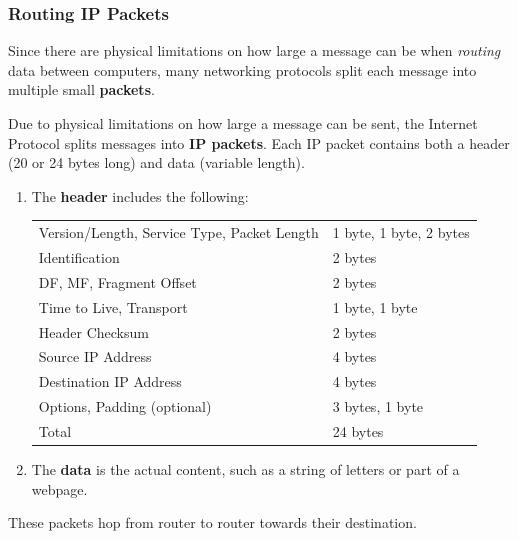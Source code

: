 \documentclass{article}
\begin{document}
  \subsubsection{Routing IP Packets}
  Since there are physical limitations on how large a message can be when \textit{routing} data between computers, many networking protocols split each message into multiple small \textbf{packets}. 

  \begin{definition}
  Due to physical limitations on how large a message can be sent, the Internet Protocol splits messages into \textbf{IP packets}. Each IP packet contains both a header (20 or 24 bytes long) and data (variable length). 
  \begin{enumerate}
      \item The \textbf{header} includes the following: 
      \begin{center}
      \begin{tabular}{l|l}
          Version/Length, Service Type, Packet Length & 1 byte, 1 byte, 2 bytes \\
          Identification & 2 bytes \\
          DF, MF, Fragment Offset & 2 bytes \\
          Time to Live, Transport & 1 byte, 1 byte \\
          Header Checksum & 2 bytes \\
          Source IP Address & 4 bytes\\
          Destination IP Address & 4 bytes \\
          Options, Padding (optional) & 3 bytes, 1 byte \\
          \hline
          Total & 24 bytes
      \end{tabular}
      \end{center}
      \item The \textbf{data} is the actual content, such as a string of letters or part of a webpage. 
  \end{enumerate}
  These packets hop from router to router towards their destination.
  \end{definition}
\end{document}
